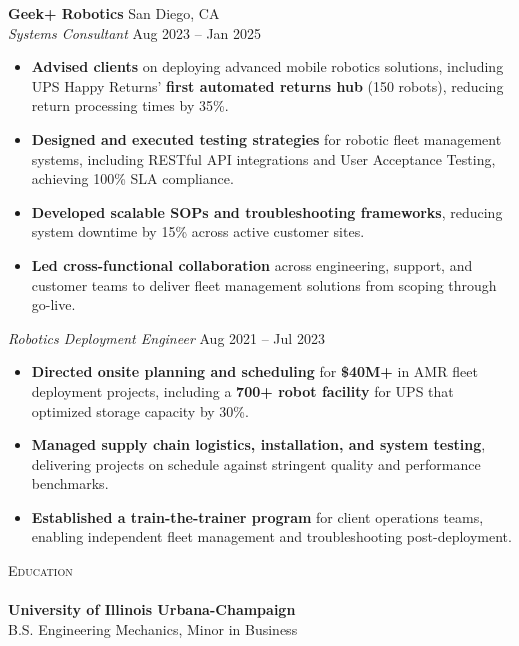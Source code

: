 \documentclass[letterpaper]{article}
\newcommand{\lineunder} {
    \vspace*{-8pt} \\
    \hspace*{-18pt} \hrulefill \\
}
\newcommand{\header} [1] {
    {\hspace*{-18pt}\vspace*{6pt} \fontsize{12pt}{14pt}\selectfont\textsc{#1}}
    \vspace*{-6pt} \lineunder
}
\begin{document}
\textbf{Geek+ Robotics} \hfill San Diego, CA \\
\textit{Systems Consultant} \hfill Aug 2023 -- Jan 2025\\
\vspace{-2mm}
\begin{itemize} \itemsep 1pt
\item \textbf{Advised clients} on deploying advanced mobile robotics solutions, including UPS Happy Returns' \textbf{first automated returns hub} (150 robots), reducing return processing times by 35\%.
\item \textbf{Designed and executed testing strategies} for robotic fleet management systems, including RESTful API integrations and User Acceptance Testing, achieving 100\% SLA compliance.
\item \textbf{Developed scalable SOPs and troubleshooting frameworks}, reducing system downtime by 15\% across active customer sites.
\item \textbf{Led cross-functional collaboration} across engineering, support, and customer teams to deliver fleet management solutions from scoping through go-live.
\end{itemize}
\vspace{-2mm}
\noindent \textit{Robotics Deployment Engineer} \hfill Aug 2021 -- Jul 2023\\
\vspace{-2mm}
\begin{itemize} \itemsep 1pt
    \item \textbf{Directed onsite planning and scheduling} for \textbf{\$40M+} in AMR fleet deployment projects, including a \textbf{700+ robot facility} for UPS that optimized storage capacity by 30\%.
    \item \textbf{Managed supply chain logistics, installation, and system testing}, delivering projects on schedule against stringent quality and performance benchmarks.
    \item \textbf{Established a train-the-trainer program} for client operations teams, enabling independent fleet management and troubleshooting post-deployment.
\end{itemize}
\vspace{-1mm}

\header{Education}
\textbf{University of Illinois Urbana-Champaign}\\
B.S. Engineering Mechanics, Minor in Business \hfill \\
\vspace{2mm}
\end{document}

